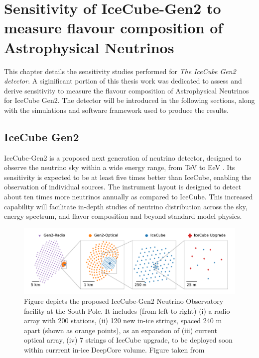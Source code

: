 \setchapterpreamble[u]{\margintoc}
\chapter{Sensitivity of IceCube-Gen2 to measure flavour composition of Astrophysical Neutrinos}
This chapter details the sensitivity studies performed for \emph{The IceCube Gen2 detector}. A siginificant portion of this thesis work was dedicated to assess and derive sensitivity to measure the flavour composition of Astrophysical Neutrinos for IceCube Gen2. The detector will be introduced in the following sections, along with the simulations and software framework used to produce the results. 

\section{IceCube Gen2} 
\label{sec:gen2-detector}
IceCube-Gen2 is a proposed next generation of neutrino detector, designed to observe the neutrino sky within a wide energy range, from TeV to EeV . Its sensitivity is expected to be at least five times better than IceCube, enabling the observation of individual sources. The instrument layout is designed to detect about ten times more neutrinos annually as compared to IceCube. This increased capability will facilitate in-depth studies of neutrino distribution across the sky, energy spectrum, and flavor composition and beyond standard model physics.
\begin{figure}[h!]
	\includegraphics[scale=1.5]{./figures/gen2/decadal_survey_gen2-fan_radio_geometry.pdf}
	\caption{Figure depicts the proposed IceCube-Gen2 Neutrino Observatory facility at the South Pole. It includes (from left to right) (i) a radio array with 200 stations, (ii) 120 new in-ice strings, spaced 240 m apart (shown as orange points), as an expansion of (iii) current optical array, (iv) 7 strings of IceCube upgrade, to be deployed soon within currrent in-ice DeepCore volume. Figure taken from \cite{whitepaper}}
\end{figure}

